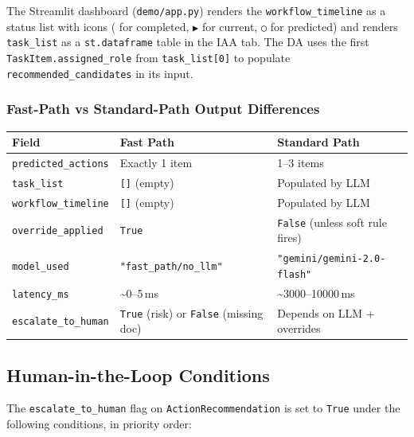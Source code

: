 \documentclass[12pt,a4paper]{article}
\begin{document}
The Streamlit dashboard (\texttt{demo/app.py}) renders the \texttt{workflow\_timeline}
as a status list with icons (\texttt{\checkmark} for completed, \texttt{▶} for current,
\texttt{○} for predicted) and renders \texttt{task\_list} as a \texttt{st.dataframe}
table in the IAA tab. The DA uses the first \texttt{TaskItem.assigned\_role} from
\texttt{task\_list[0]} to populate \texttt{recommended\_candidates} in its input.

\subsubsection{Fast-Path vs Standard-Path Output Differences}

\begin{center}
\begin{tabular}{@{}lll@{}}
\toprule
\textbf{Field} & \textbf{Fast Path} & \textbf{Standard Path} \\
\midrule
\texttt{predicted\_actions} & Exactly 1 item & 1--3 items \\
\texttt{task\_list} & \texttt{[]} (empty) & Populated by LLM \\
\texttt{workflow\_timeline} & \texttt{[]} (empty) & Populated by LLM \\
\texttt{override\_applied} & \texttt{True} & \texttt{False} (unless soft rule fires) \\
\texttt{model\_used} & \texttt{"fast\_path/no\_llm"} & \texttt{"gemini/gemini-2.0-flash"} \\
\texttt{latency\_ms} & \textasciitilde{}0--5\,ms & \textasciitilde{}3000--10000\,ms \\
\texttt{escalate\_to\_human} & \texttt{True} (risk) or \texttt{False} (missing doc) & Depends on LLM + overrides \\
\bottomrule
\end{tabular}
\end{center}

\subsection{Human-in-the-Loop Conditions}

The \texttt{escalate\_to\_human} flag on \texttt{ActionRecommendation} is set to
\texttt{True} under the following conditions, in priority order:
\end{document}
